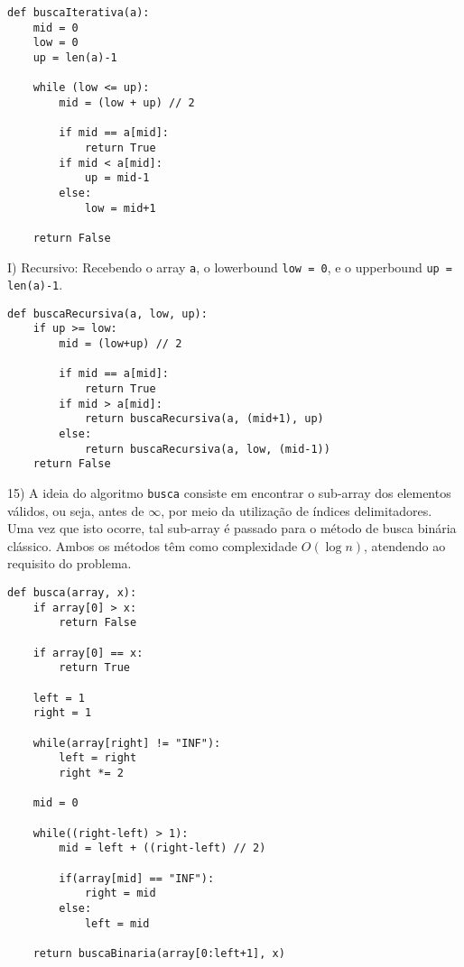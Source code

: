 \documentclass[]{article}
\begin{document}
\begin{lstlisting}
def buscaIterativa(a):
    mid = 0
    low = 0
    up = len(a)-1

    while (low <= up):
        mid = (low + up) // 2

        if mid == a[mid]:
            return True
        if mid < a[mid]:
            up = mid-1
        else:
            low = mid+1
            
    return False
\end{lstlisting}

\vspace{1cm}

I) Recursivo: Recebendo o array \texttt{a}, o lowerbound \texttt{low = 0}, e o upperbound \texttt{up = len(a)-1}.

\begin{lstlisting}
def buscaRecursiva(a, low, up):      
    if up >= low: 
        mid = (low+up) // 2
        
        if mid == a[mid]: 
            return True
        if mid > a[mid]: 
            return buscaRecursiva(a, (mid+1), up) 
        else: 
            return buscaRecursiva(a, low, (mid-1)) 
    return False
\end{lstlisting}

\newpage

15) A ideia do algoritmo \texttt{busca} consiste em encontrar o sub-array dos elementos válidos, ou seja, antes de $\infty$, por meio da utilização de índices delimitadores. Uma vez que isto ocorre, tal sub-array é passado para o método de busca binária clássico. Ambos os métodos têm como complexidade $O(\log n)$, atendendo ao requisito do problema.

\begin{lstlisting}
def busca(array, x):
    if array[0] > x:
        return False
    
    if array[0] == x:
        return True
    
    left = 1
    right = 1
    
    while(array[right] != "INF"):
        left = right
        right *= 2
        
    mid = 0
    
    while((right-left) > 1):
        mid = left + ((right-left) // 2)
        
        if(array[mid] == "INF"):
            right = mid
        else:
            left = mid
            
    return buscaBinaria(array[0:left+1], x)
\end{lstlisting}
\end{document}
